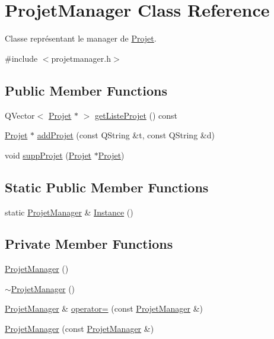 \hypertarget{class_projet_manager}{}\section{Projet\+Manager Class Reference}
\label{class_projet_manager}


Classe représentant le manager de \hyperlink{class_projet}{Projet}.  




{\ttfamily \#include $<$projetmanager.\+h$>$}

\subsection*{Public Member Functions}
\begin{DoxyCompactItemize}
\item 
Q\+Vector$<$ \hyperlink{class_projet}{Projet} $\ast$ $>$ \hyperlink{class_projet_manager_a2b7281842b818a8e2cd85a81ef270930}{get\+Liste\+Projet} () const 
\item 
\hyperlink{class_projet}{Projet} $\ast$ \hyperlink{class_projet_manager_a1c547839afb77faaa3eb2f37e0c869a7}{add\+Projet} (const Q\+String \&t, const Q\+String \&d)
\item 
void \hyperlink{class_projet_manager_a03685affdec85e48e6f4ab5128da0701}{supp\+Projet} (\hyperlink{class_projet}{Projet} $\ast$\hyperlink{class_projet}{Projet})
\end{DoxyCompactItemize}
\subsection*{Static Public Member Functions}
\begin{DoxyCompactItemize}
\item 
static \hyperlink{class_projet_manager}{Projet\+Manager} \& \hyperlink{class_projet_manager_ad61417127cad478ea812d560b18b975d}{Instance} ()
\end{DoxyCompactItemize}
\subsection*{Private Member Functions}
\begin{DoxyCompactItemize}
\item 
\hyperlink{class_projet_manager_a98d8ba59bd9bc6eec2ec5285102ac9a1}{Projet\+Manager} ()
\item 
\hyperlink{class_projet_manager_af5a44cde2f8d92f05bb7e52a18aa883a}{$\sim$\+Projet\+Manager} ()
\item 
\hyperlink{class_projet_manager}{Projet\+Manager} \& \hyperlink{class_projet_manager_a25b560fb4e617952ad093bbe74315aaa}{operator=} (const \hyperlink{class_projet_manager}{Projet\+Manager} \&)
\item 
\hyperlink{class_projet_manager_abfdc065f2c1819e13c8adc1562536f35}{Projet\+Manager} (const \hyperlink{class_projet_manager}{Projet\+Manager} \&)
\end{DoxyCompactItemize}
